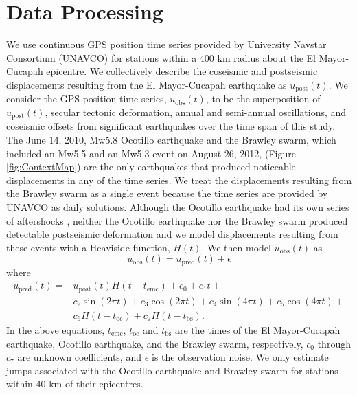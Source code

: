 \documentclass[review]{elsarticle}
\begin{document}
\section{Data Processing}\label{sec:Data}

We use continuous GPS position time series provided by University Navstar Consortium (UNAVCO) for stations within a 400 km radius about the El Mayor-Cucapah epicentre. We collectively describe the coseismic and postseismic displacements resulting from the El Mayor-Cucapah earthquake as $u_\mathrm{post}(t)$.  We consider the GPS position time series, $u_\mathrm{obs}(t)$, to be the superposition of $u_\mathrm{post}(t)$, secular tectonic deformation, annual and semi-annual oscillations, and coseismic offsets from significant earthquakes over the time span of this study.  The June 14, 2010, Mw5.8 Ocotillo earthquake and the Brawley swarm, which included an Mw5.5 and an Mw5.3 event on August 26, 2012, (Figure \ref{fig:ContextMap}) are the only earthquakes that produced noticeable displacements in any of the time series.  We treat the displacements resulting from the Brawley swarm as a single event because the time series are provided by UNAVCO as daily solutions. Although the Ocotillo earthquake had its own series of aftershocks \citep{Hauksson2011}, neither the Ocotillo earthquake nor the Brawley swarm produced detectable postseismic deformation and we model displacements resulting from these events with a Heaviside function, $H(t)$.  We then model $u_\mathrm{obs}(t)$ as 
\begin{equation}
  u_\mathrm{obs}(t) = u_\mathrm{pred}(t) + \epsilon
\end{equation}
where
\begin{equation}\label{TimeSeriesModel}
  \begin{split}  
    u_\mathrm{pred}(t) = &u_\mathrm{post}(t)H(t-t_\mathrm{emc}) + c_0 + c_1t + \\
                         &c_2\sin(2\pi t) + c_3\cos(2\pi t) + c_4\sin(4\pi t) + c_5\cos(4\pi t) + \\
                         &c_6H(t-t_\mathrm{oc}) + c_7H(t-t_\mathrm{bs}).
  \end{split}
\end{equation}
In the above equations, $t_\mathrm{emc}$, $t_\mathrm{oc}$ and $t_\mathrm{bs}$ are the times of the El Mayor-Cucapah earthquake, Ocotillo earthquake, and the Brawley swarm, respectively, $c_0$ through $c_7$ are unknown coefficients, and $\epsilon$ is the observation noise. We only estimate jumps associated with the Ocotillo earthquake and Brawley swarm for stations within 40 km of their epicentres. 
\end{document}
